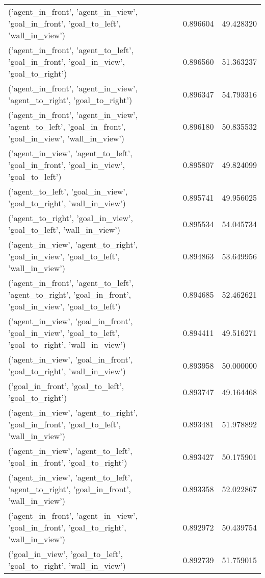 \begin{tabular}{lrr}
('agent\_in\_front', 'agent\_in\_view', 'goal\_in\_front', 'goal\_to\_left', 'wall\_in\_view') & 0.896604 & 49.428320 \\
('agent\_in\_front', 'agent\_to\_left', 'goal\_in\_front', 'goal\_in\_view', 'goal\_to\_right') & 0.896560 & 51.363237 \\
('agent\_in\_front', 'agent\_in\_view', 'agent\_to\_right', 'goal\_to\_right') & 0.896347 & 54.793316 \\
('agent\_in\_front', 'agent\_in\_view', 'agent\_to\_left', 'goal\_in\_front', 'goal\_in\_view', 'wall\_in\_view') & 0.896180 & 50.835532 \\
('agent\_in\_view', 'agent\_to\_left', 'goal\_in\_front', 'goal\_in\_view', 'goal\_to\_left') & 0.895807 & 49.824099 \\
('agent\_to\_left', 'goal\_in\_view', 'goal\_to\_right', 'wall\_in\_view') & 0.895741 & 49.956025 \\
('agent\_to\_right', 'goal\_in\_view', 'goal\_to\_left', 'wall\_in\_view') & 0.895534 & 54.045734 \\
('agent\_in\_view', 'agent\_to\_right', 'goal\_in\_view', 'goal\_to\_left', 'wall\_in\_view') & 0.894863 & 53.649956 \\
('agent\_in\_front', 'agent\_to\_left', 'agent\_to\_right', 'goal\_in\_front', 'goal\_in\_view', 'goal\_to\_left') & 0.894685 & 52.462621 \\
('agent\_in\_view', 'goal\_in\_front', 'goal\_in\_view', 'goal\_to\_left', 'goal\_to\_right', 'wall\_in\_view') & 0.894411 & 49.516271 \\
('agent\_in\_view', 'goal\_in\_front', 'goal\_to\_right', 'wall\_in\_view') & 0.893958 & 50.000000 \\
('goal\_in\_front', 'goal\_to\_left', 'goal\_to\_right') & 0.893747 & 49.164468 \\
('agent\_in\_view', 'agent\_to\_right', 'goal\_in\_front', 'goal\_to\_left', 'wall\_in\_view') & 0.893481 & 51.978892 \\
('agent\_in\_view', 'agent\_to\_left', 'goal\_in\_front', 'goal\_to\_right') & 0.893427 & 50.175901 \\
('agent\_in\_view', 'agent\_to\_left', 'agent\_to\_right', 'goal\_in\_front', 'wall\_in\_view') & 0.893358 & 52.022867 \\
('agent\_in\_front', 'agent\_in\_view', 'goal\_in\_front', 'goal\_to\_right', 'wall\_in\_view') & 0.892972 & 50.439754 \\
('goal\_in\_view', 'goal\_to\_left', 'goal\_to\_right', 'wall\_in\_view') & 0.892739 & 51.759015 \\

\end{tabular}
